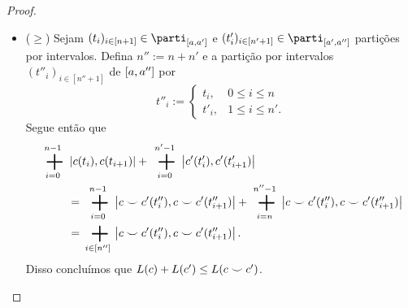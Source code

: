 \begin{proof}
\begin{itemize}
	\item ($\geq$) Sejam $(t_i)_{i \in [n+1]} \in \parti_{\intff{a}{a'}}$ e $(t'_i)_{i \in [n'+1]} \in \parti_{\intff{a'}{a''}}$ partições por intervalos. Defina $n'' := n+n'$ e a partição por intervalos $(t''_i)_{i \in [n''+1]}$ de $\left[{a},{a''}\right]$ por
		\begin{equation*}
		t''_i := \begin{cases}
				t_i,	& 0 \leq i \leq n \\
				t'_i,	& 1 \leq i \leq n'.
				\end{cases}
		\end{equation*}
	Segue então que
		\begin{align*}
		\sum_{i=0}^{n-1}& \dist{c(t_i)}{c(t_{i+1})} + \sum_{i=0}^{n'-1} \dist{c'(t'_i)}{c'(t'_{i+1})} \\
			&= \sum_{i=0}^{n-1} \dist{c \conca c'(t''_i)}{c \conca c'(t''_{i+1})} + \sum_{i=n}^{n''-1} \dist{c \conca c'(t''_i)}{c \conca c'(t''_{i+1})} \\
			&= \sum_{i \in [n'']} \dist{c \conca c'(t''_i)}{c \conca c'(t''_{i+1})}.
		\end{align*}
	Disso concluímos que $L(c) + L(c') \leq L(c \smile c')$.
	\end{itemize}
\end{proof}

